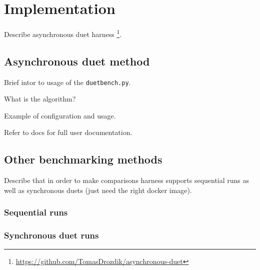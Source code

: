 \chapter{Implementation}

Describe asynchronous duet harness \footnote{\url{https://github.com/TomasDrozdik/asynchronous-duet}}.


\section{Asynchronous duet method}

Brief intor to usage of the \lstinline{duetbench.py}.

What is the algorithm?

Example of configuration and usage.

Refer to docs  for full user documentation.


\section{Other benchmarking methods}

Describe that in order to make comparisons harness supports sequential runs as well as synchronous duets (just need the right docker image).

\subsection{Sequential runs}

\subsection{Synchronous duet runs}
